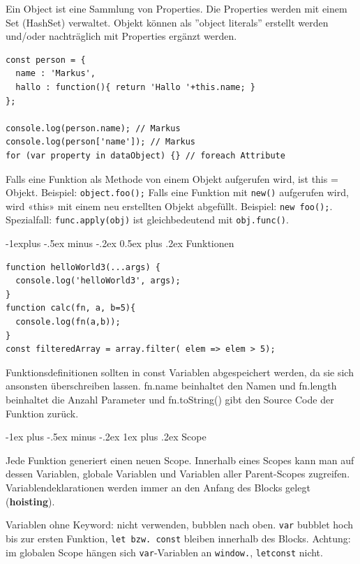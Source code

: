 \documentclass[a4paper, fontsize=6pt]{scrartcl}
\makeatletter
\renewcommand{\subsection}{\@startsection{subsection}{2}{0mm}%
    {-1explus -.5ex minus -.2ex}%
    {0.5ex plus .2ex}%
    {\normalfont\normalsize\bfseries}}
\renewcommand{\subsubsection}{\@startsection{subsubsection}{3}{0mm}%
    {-1ex plus -.5ex minus -.2ex}%
    {1ex plus .2ex}%
    {\normalfont\small\bfseries}}
\makeatother
\begin{document}
\begin{multicols*}{5}
Ein Object ist eine Sammlung von Properties. Die Properties werden mit einem Set (HashSet) verwaltet. Objekt können als ''object literals'' erstellt werden und/oder nachträglich mit Properties ergänzt werden.

\begin{verbatim}
const person = {
  name : 'Markus',
  hallo : function(){ return 'Hallo '+this.name; }
};

console.log(person.name); // Markus
console.log(person['name']); // Markus
for (var property in dataObject) {} // foreach Attribute
\end{verbatim}

Falls eine Funktion als Methode von einem Objekt aufgerufen wird, ist this = Objekt. Beispiel: \texttt{object.foo();} Falls eine Funktion mit \texttt{new()} aufgerufen wird, wird «this» mit einem neu erstellten Objekt abgefüllt. Beispiel: \texttt{new foo();}. Spezialfall: \texttt{func.apply(obj)} ist gleichbedeutend mit \texttt{obj.func()}.

\subsection{Funktionen}

\begin{verbatim}
function helloWorld3(...args) {
  console.log('helloWorld3', args);
}
function calc(fn, a, b=5){
  console.log(fn(a,b));
}
const filteredArray = array.filter( elem => elem > 5);
\end{verbatim}
Funktionsdefinitionen sollten in const Variablen abgespeichert werden, da sie sich ansonsten überschreiben lassen. fn.name beinhaltet den Namen und fn.length beinhaltet die Anzahl Parameter und fn.toString() gibt den Source Code der Funktion zurück.

\subsubsection{Scope}

Jede Funktion generiert einen neuen Scope. Innerhalb eines Scopes kann man auf dessen Variablen, globale Variablen und Variablen aller Parent-Scopes zugreifen. Variablendeklarationen werden immer an den Anfang des Blocks gelegt (\textbf{hoisting}).

Variablen ohne Keyword: nicht verwenden, bubblen nach oben. \texttt{var} bubblet hoch bis zur ersten Funktion, \texttt{let bzw. const} bleiben innerhalb des Blocks. Achtung: im globalen Scope hängen sich \texttt{var}-Variablen an \texttt{window.}, \texttt{let\/const} nicht.


\end{multicols*}
\end{document}
